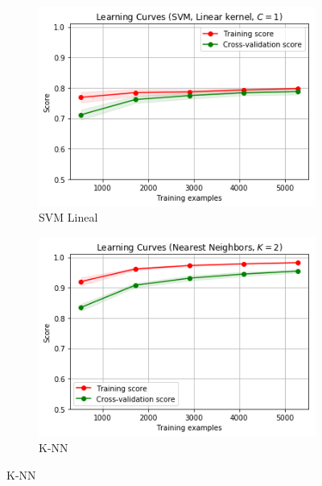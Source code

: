 \begin{figure}[ht!]
\begin{subfigure}{.5\textwidth}
  \centering
  \includegraphics[width=.8\linewidth]{figures/SVM-Lineal.png}
  \caption{SVM Lineal}
  \label{fig:sub1}
\end{subfigure}%
\begin{subfigure}{.5\textwidth}
  \centering
  \includegraphics[width=.8\linewidth]{figures/knn-results.png}
  \caption{K-NN}
  \label{fig:sub2}
\end{subfigure}


\end{figure}

